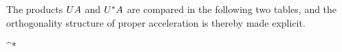 \noindent The products \(UA\) and \(U^{*}A\) are compared in the following two tables, and the orthogonality structure of proper acceleration is thereby made explicit.
\begin{componenttable}{}
\end{componenttable}

\begin{componenttable}{^{*}}
\end{componenttable}
